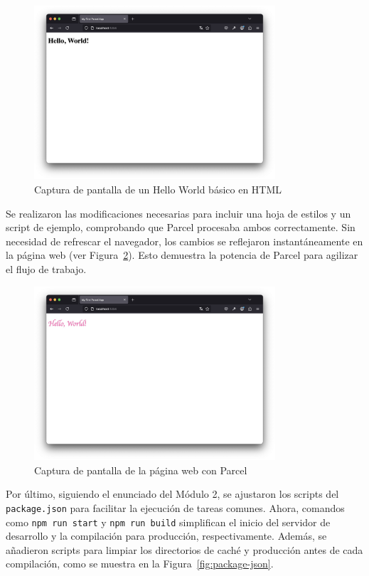 \documentclass{article}
\begin{document}
 \begin{figure}[h!]
     \centering
     \includegraphics[width=0.8\textwidth]{./img/hello-world}
     \caption{Captura de pantalla de un Hello World básico en HTML}
     \label{fig:hello-world}
 \end{figure}

Se realizaron las modificaciones necesarias para incluir una hoja de estilos y un script de ejemplo, comprobando que Parcel procesaba ambos correctamente. Sin necesidad de refrescar el navegador, los cambios se reflejaron instantáneamente en la página web (ver Figura~\ref{fig:parcel}). Esto demuestra la potencia de Parcel para agilizar el flujo de trabajo.

 \begin{figure}[h!]
     \centering
     \includegraphics[width=0.8\textwidth]{./img/hello-world-styled}
     \caption{Captura de pantalla de la página web con Parcel}
     \label{fig:parcel}
 \end{figure}

Por último, siguiendo el enunciado del Módulo 2, se ajustaron los scripts del \texttt{package.json} para facilitar la ejecución de tareas comunes. Ahora, comandos como \texttt{npm run start} y \texttt{npm run build} simplifican el inicio del servidor de desarrollo y la compilación para producción, respectivamente. Además, se añadieron scripts para limpiar los directorios de caché y producción antes de cada compilación, como se muestra en la Figura~\ref{fig:package-json}.
\end{document}
